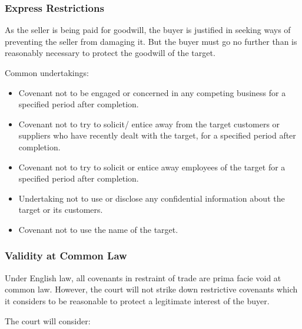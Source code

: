 \documentclass[
]{article}
\newenvironment{Shaded}{}{}
\newcommand{\NormalTok}[1]{#1}
\providecommand{\tightlist}{%
  \setlength{\itemsep}{0pt}\setlength{\parskip}{0pt}}
\begin{document}
\hypertarget{express-restrictions}{%
\subsubsection{Express Restrictions}\label{express-restrictions}}

As the seller is being paid for goodwill, the buyer is justified in
seeking ways of preventing the seller from damaging it. But the buyer
must go no further than is reasonably necessary to protect the goodwill
of the target.

Common undertakings:

\begin{itemize}
\tightlist
\item
  Covenant not to be engaged or concerned in any competing business for
  a specified period after completion.
\item
  Covenant not to try to solicit/ entice away from the target customers
  or suppliers who have recently dealt with the target, for a specified
  period after completion.
\item
  Covenant not to try to solicit or entice away employees of the target
  for a specified period after completion.
\item
  Undertaking not to use or disclose any confidential information about
  the target or its customers.
\item
  Covenant not to use the name of the target.
\end{itemize}

\hypertarget{validity-at-common-law}{%
\subsubsection{Validity at Common Law}\label{validity-at-common-law}}

\begin{Shaded}
\begin{Highlighting}[]
\NormalTok{Under English law, all covenants in restraint of trade are prima facie void at common law. However, the court will not strike down restrictive covenants which it considers to be reasonable to protect a legitimate interest of the buyer.}
\end{Highlighting}
\end{Shaded}

The court will consider:
\end{document}
